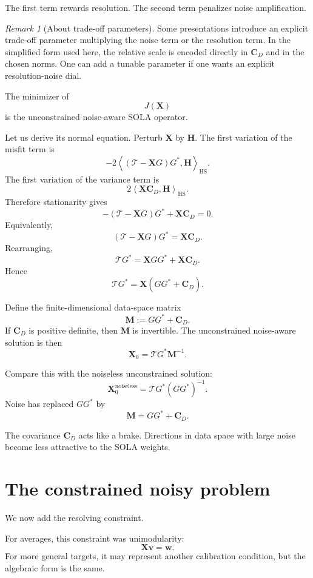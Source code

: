 \documentclass[11pt,openany]{book}
\theoremstyle{definition}
\theoremstyle{remark}
\newtheorem{remark}{Remark}[chapter]
\newcommand{\Tau}{\mathcal{T}}
\newcommand{\HS}{\mathrm{HS}}
\begin{document}
The first term rewards resolution. The second term penalizes noise amplification.

\begin{remark}[About trade-off parameters]
Some presentations introduce an explicit trade-off parameter multiplying the noise term or the
resolution term. In the simplified form used here, the relative scale is encoded directly in
\(\mathbf C_D\) and in the chosen norms. One can add a tunable parameter if one wants an
explicit resolution-noise dial.
\end{remark}

The minimizer of
\[
  J(\mathbf X)
\]
is the unconstrained noise-aware SOLA operator.

Let us derive its normal equation. Perturb \(\mathbf X\) by \(\mathbf H\). The first variation of the
misfit term is
\[
  -2
  \left\langle
    (\Tau-\mathbf XG)G^*,
    \mathbf H
  \right\rangle_{\HS}.
\]
The first variation of the variance term is
\[
  2
  \left\langle
    \mathbf X\mathbf C_D,
    \mathbf H
  \right\rangle_{\HS}.
\]
Therefore stationarity gives
\[
  -(\Tau-\mathbf XG)G^*+\mathbf X\mathbf C_D=0.
\]
Equivalently,
\[
  (\Tau-\mathbf XG)G^*
  =
  \mathbf X\mathbf C_D.
\]
Rearranging,
\[
  \Tau G^*
  =
  \mathbf XGG^*+\mathbf X\mathbf C_D.
\]
Hence
\[
  \Tau G^*
  =
  \mathbf X(GG^*+\mathbf C_D).
\]

Define the finite-dimensional data-space matrix
\[
  \mathbf M
  :=
  GG^*+\mathbf C_D.
\]
If \(\mathbf C_D\) is positive definite, then \(\mathbf M\) is invertible. The unconstrained
noise-aware solution is then
\[
  \mathbf X_0
  =
  \Tau G^*\mathbf M^{-1}.
\]

Compare this with the noiseless unconstrained solution:
\[
  \mathbf X_0^{\mathrm{noiseless}}
  =
  \Tau G^*(GG^*)^{-1}.
\]
Noise has replaced \(GG^*\) by
\[
  \mathbf M=GG^*+\mathbf C_D.
\]

\begin{intuitionbox}
The covariance \(\mathbf C_D\) acts like a brake. Directions in data space with large noise become
less attractive to the SOLA weights.
\end{intuitionbox}

\section{The constrained noisy problem}

We now add the resolving constraint.

For averages, this constraint was unimodularity:
\[
  \mathbf X\mathbf v=\mathbf w.
\]
For more general targets, it may represent another calibration condition, but the algebraic form
is the same.
\end{document}
